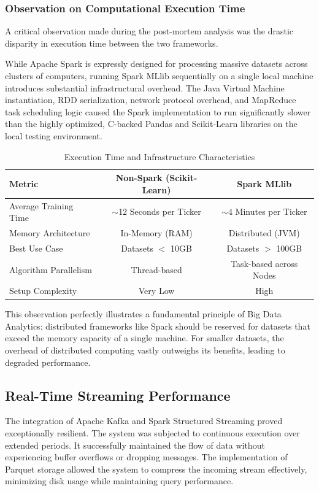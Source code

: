 \documentclass[12pt,a4paper]{report}
\begin{document}
\subsubsection{Observation on Computational Execution Time}

A critical observation made during the post-mortem analysis was the drastic disparity in execution time between the two frameworks. 

While Apache Spark is expressly designed for processing massive datasets across clusters of computers, running Spark MLlib sequentially on a single local machine introduces substantial infrastructural overhead. The Java Virtual Machine instantiation, RDD serialization, network protocol overhead, and MapReduce task scheduling logic caused the Spark implementation to run significantly slower than the highly optimized, C-backed Pandas and Scikit-Learn libraries on the local testing environment. 

\begin{table}[H]
\centering
\caption{Execution Time and Infrastructure Characteristics}
\begin{tabular}{|l|c|c|}
\hline
\textbf{Metric} & \textbf{Non-Spark (Scikit-Learn)} & \textbf{Spark MLlib} \\
\hline
Average Training Time & $\sim$12 Seconds per Ticker & $\sim$4 Minutes per Ticker \\
Memory Architecture & In-Memory (RAM) & Distributed (JVM) \\
Best Use Case & Datasets $<$ 10GB & Datasets $>$ 100GB \\
Algorithm Parallelism & Thread-based & Task-based across Nodes \\
Setup Complexity & Very Low & High \\
\hline
\end{tabular}
\end{table}

This observation perfectly illustrates a fundamental principle of Big Data Analytics: distributed frameworks like Spark should be reserved for datasets that exceed the memory capacity of a single machine. For smaller datasets, the overhead of distributed computing vastly outweighs its benefits, leading to degraded performance.

\subsection{Real-Time Streaming Performance}

The integration of Apache Kafka and Spark Structured Streaming proved exceptionally resilient. The system was subjected to continuous execution over extended periods. It successfully maintained the flow of data without experiencing buffer overflows or dropping messages. The implementation of Parquet storage allowed the system to compress the incoming stream effectively, minimizing disk usage while maintaining query performance.
\end{document}
